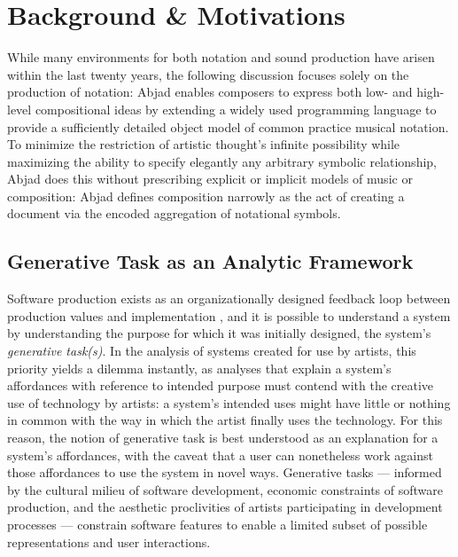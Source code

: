\section{Background \& Motivations}\label{sec:background}

While many environments for both notation and sound production have arisen
within the last twenty years, the following discussion focuses solely on the
production of notation: Abjad enables composers to express both low- and
high-level compositional ideas by extending a widely used programming language
to provide a sufficiently detailed object model of common practice musical
notation. To minimize the restriction of artistic thought's infinite
possibility while maximizing the ability to specify elegantly any arbitrary
symbolic relationship, Abjad does this without prescribing explicit or implicit
models of music or composition: Abjad defines composition narrowly as the act
of creating a document via the encoded aggregation of notational symbols.

\subsection{Generative Task as an Analytic Framework}
Software production exists as an organizationally designed feedback loop between production values and implementation \cite{Derniame:1999fk}, and it is possible to understand a system by understanding the purpose for which it was initially designed, the system's \emph{generative task(s)}. In the analysis of systems created for use by artists, this priority yields a dilemma instantly, as analyses that explain a system's affordances with reference to intended purpose must contend with the creative use of technology by artists: a system's intended uses might have little or nothing in common with the way in which the artist finally uses the technology. For this reason, the notion of generative task is best understood as an explanation for a system's affordances, with the caveat that a user can nonetheless work against those affordances to use the system in novel ways. Generative tasks --- informed by the cultural milieu of software development, economic constraints of software production, and the aesthetic proclivities of artists participating in development processes --- constrain software features to enable a limited subset of possible representations and user interactions.

